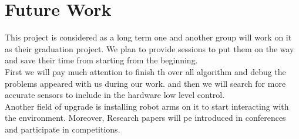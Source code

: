 \documentclass[12pt]{article}
\newcommand\blankpage{%
	\null
	\thispagestyle{empty}%
	\addtocounter{page}{-1}%
	\newpage}
\begin{document}
\afterpage{\blankpage}
\newpage

\section{Future Work}
This project is considered as a long term one and another group will work on it as their graduation project. We plan to provide sessions to put them on the way and save their time from starting from the beginning.\\

\noindent First we will pay much attention to finish th over all algorithm and debug the problems appeared with us during our work. and then we will search for more accurate sensors to include in the hardware low level control. \\

\noindent Another field of upgrade is installing robot arms on it to start interacting with the environment. Moreover, Research papers will pe introduced in conferences and participate in competitions.


\newpage
 


\end{document}
